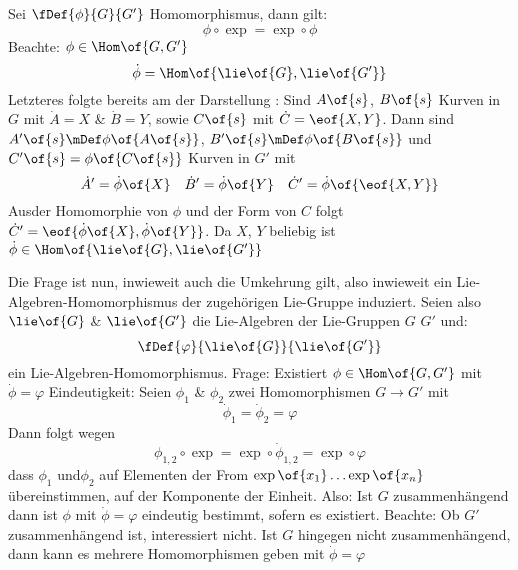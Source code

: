 \begin{korollar}
	Sei $\fDef{\phi}{G}{G'}$ \difb Homomorphismus, dann gilt:
	\begin{equation}
		\phi\circ\exp = \exp\circ\phi
	\end{equation}
	Beachte: $\phi\in \Hom\of{G,G'}$
	\begin{equation}
		\dot{\phi} = \Hom\of{\lie\of{G},\lie\of{G'}}
	\end{equation}
	Letzteres folgte bereits am \exmpl der Darstellung : Sind $A\of{s}$, $B\of{s}$ Kurven in $G$ mit $\dot{A} = X$ \& $\dot{B} = Y$, sowie $C\of{s}$ mit $\dot{C} = \eof{X,Y}$. Dann sind $A'\of{s} \mDef \phi\of{A\of{s}}$, $B'\of{s} \mDef \phi\of{B\of{s}}$ und $C'\of{s} = \phi\of{C\of{s}}$ Kurven in $G'$ mit 
	\begin{equation}
		\dot{A}' = \dot{\phi}\of{X} \quad \dot{B}' = \dot{\phi}\of{Y} \quad \dot{C}' = \dot{\phi}\of{\eof{X,Y}}
	\end{equation}
	Ausder Homomorphie von $\phi$ und der Form von $C$  folgt $\dot{C}' = \eof{\dot{\phi}\of{X},\dot{\phi}\of{Y}}$. Da $X$, $Y$ beliebig ist $\dot{\phi} \in \Hom\of{\lie\of{G},\lie\of{G'}}$
\end{korollar}
Die Frage ist nun, inwieweit auch die Umkehrung gilt, also inwieweit ein Lie-Algebren-Homomorphismus der zugehörigen Lie-Gruppe induziert. Seien also $\lie\of{G}$ \& $\lie\of{G'}$ die Lie-Algebren der Lie-Gruppen $G$ \bzw $G'$ und:
\begin{equation}
	\fDef{\varphi}{\lie\of{G}}{\lie\of{G'}}
\end{equation}
ein Lie-Algebren-Homomorphismus. Frage: Existiert $\phi\in\Hom\of{G,G'}$ mit $\dot{\phi} = \varphi$ Eindeutigkeit: Seien $\phi_1$ \& $\phi_2$ zwei Homomorphismen $G \to G'$ mit 
\begin{equation}
	\dot{\phi}_1 = \dot{\phi}_2 = \varphi
\end{equation}
Dann folgt wegen 
\begin{equation}
	\phi_{1,2} \circ \exp = \exp \circ \dot{\phi}_{1,2} = \exp \circ \varphi
\end{equation}
dass $\phi_1$ und$\phi_2$ auf Elementen der From $\exp\of{x_1}\dots \exp\of{x_n}$ übereinstimmen, \dah auf der Komponente der Einheit. Also: Ist $G$ zusammenhängend dann ist $\phi$ mit $\dot{\phi} = \varphi$ eindeutig bestimmt, sofern es existiert. Beachte: Ob $G'$ zusammenhängend ist, interessiert nicht. Ist $G$ hingegen nicht zusammenhängend, dann kann es mehrere Homomorphismen geben mit $\dot{\phi} = \varphi$

